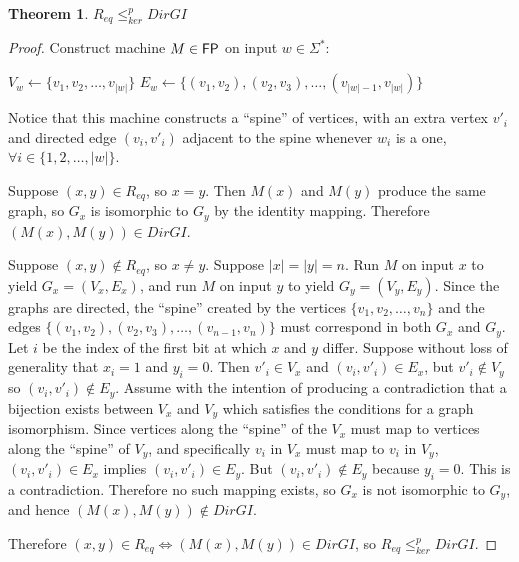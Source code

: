 \documentclass[draft]{article}
\newtheorem{theorem}{Theorem}%
\theoremstyle{definition}
\newcommand{\sigmastar}{\Sigma^{*}}
\newcommand{\kr}{\leq^{p}_{ker}} %
\begin{document}
\begin{theorem}\label{thm:req_kr_dirgi}$R_{eq} \kr DirGI$\end{theorem}
\begin{proof}
  Construct machine $M\in{\ensuremath{\mathsf{FP}}}$ on input $w\in\sigmastar$:\\
  \begin{algorithm}[H]
    $V_w\gets\{v_1, v_2, \ldots, v_{|w|}\}$\; 
    $E_w\gets\{(v_1, v_2), (v_2, v_3), \ldots, (v_{|w|-1},
    v_{|w|})\}$\;
  \end{algorithm}
  Notice that this machine constructs a ``spine'' of vertices, with an extra
  vertex $v'_i$ and directed edge $(v_i, v'_i)$ adjacent to the spine whenever
  $w_i$ is a one, $\forall i\in\{1,2,\ldots,|w|\}$.

  Suppose $(x, y)\in R_{eq}$, so $x=y$. Then $M(x)$ and $M(y)$ produce the same
  graph, so $G_x$ is isomorphic to $G_y$ by the identity mapping. Therefore
  $(M(x), M(y))\in DirGI$.
  
  Suppose $(x, y)\notin R_{eq}$, so $x\neq y$. Suppose $|x|=|y|=n$. Run $M$ on
  input $x$ to yield $G_x=(V_x, E_x)$, and run $M$ on input $y$ to yield
  $G_y=(V_y, E_y)$. Since the graphs are directed, the ``spine'' created by the
  vertices $\{v_1, v_2, \ldots, v_n\}$ and the edges $\{(v_1, v_2), (v_2, v_3),
  \ldots, (v_{n-1}, v_n)\}$ must correspond in both $G_x$ and $G_y$. Let $i$ be
  the index of the first bit at which $x$ and $y$ differ. Suppose without loss
  of generality that $x_i=1$ and $y_i=0$. Then $v'_i\in V_x$ and $(v_i,
  v'_i)\in E_x$, but $v'_i\notin V_y$ so $(v_i, v'_i)\notin E_y$. Assume with
  the intention of producing a contradiction that a bijection exists between
  $V_x$ and $V_y$ which satisfies the conditions for a graph isomorphism. Since
  vertices along the ``spine'' of the $V_x$ must map to vertices along the
  ``spine'' of $V_y$, and specifically $v_i$ in $V_x$ must map to $v_i$ in
  $V_y$, $(v_i, v'_i)\in E_x$ implies $(v_i, v'_i)\in E_y$. But $(v_i,
  v'_i)\notin E_y$ because $y_i=0$. This is a contradiction. Therefore no such
  mapping exists, so $G_x$ is not isomorphic to $G_y$, and hence $(M(x),
  M(y))\notin DirGI$.

  Therefore $(x, y)\in R_{eq} \iff (M(x), M(y))\in DirGI$, so $R_{eq}\kr
  DirGI$.
\end{proof}
\end{document}
